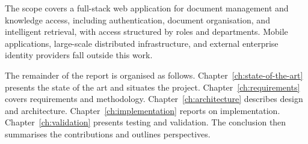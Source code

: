 The scope covers a full-stack web application for document management and
knowledge access, including authentication, document organisation, and
intelligent retrieval, with access structured by roles and departments. Mobile
applications, large-scale distributed infrastructure, and external enterprise
identity providers fall outside this work.

The remainder of the report is organised as follows.
Chapter~\ref{ch:state-of-the-art} presents the state of the art and situates the
project. Chapter~\ref{ch:requirements} covers requirements and methodology.
Chapter~\ref{ch:architecture} describes design and architecture.
Chapter~\ref{ch:implementation} reports on implementation.
Chapter~\ref{ch:validation} presents testing and validation. The conclusion then
summarises the contributions and outlines perspectives.
